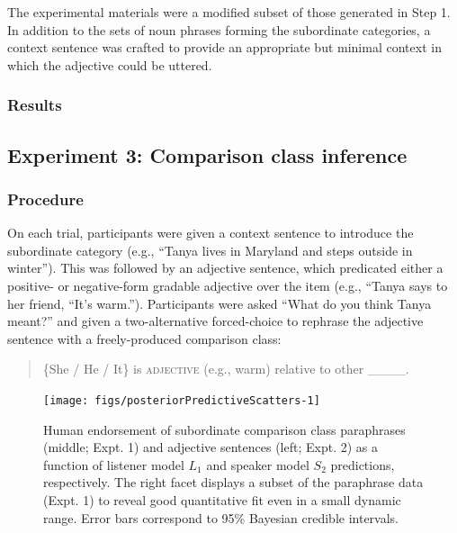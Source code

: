 \documentclass[doc]{apa6}
\begin{document}
The experimental materials were a modified subset of those generated in Step 1. 
In addition to the sets of noun phrases forming the subordinate categories, a context sentence was crafted to provide an appropriate but minimal context in which the adjective could be uttered. 

\subsubsection{Results}

\subsection{Experiment 3: Comparison class inference}

\subsubsection{Procedure}

On each trial, participants were given a context sentence to introduce
the subordinate category (e.g., ``Tanya lives in Maryland and
steps outside in winter''). This was followed by an adjective sentence,
which predicated either a positive- or negative-form gradable adjective
over the item (e.g., ``Tanya says to her friend, ``It's
warm.''). Participants were asked ``What do you think Tanya
meant?'' and given a two-alternative forced-choice to rephrase the
adjective sentence with a freely-produced comparison class:

\begin{quote}
\{She / He / It\} is \textsc{adjective} (e.g., warm) relative to other \_\_\_\_.
\end{quote}

\begin{figure}[htb]

{\centering \texttt{[image: figs/posteriorPredictiveScatters-1]} 

}

\caption{Human endorsement of subordinate comparison class paraphrases (middle; Expt. 1) and adjective sentences (left; Expt. 2) as a function of listener model $L_1$ and speaker model $S_2$ predictions, respectively. The right facet displays a subset of the paraphrase data (Expt. 1) to reveal good quantitative fit even in a small dynamic range. Error bars correspond to 95\% Bayesian credible intervals.}\label{fig:posteriorPredictiveScatters}
\end{figure}
\end{document}
